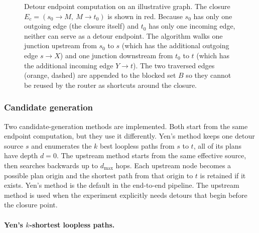 \begin{figure}[H]
\caption{Detour endpoint computation on an illustrative graph. The closure
$E_c = (s_0\!\to\!M,\ M\!\to\!t_0)$ is shown in red. Because $s_0$ has only
one outgoing edge (the closure itself) and $t_0$ has only one incoming edge,
neither can serve as a detour endpoint. The algorithm walks one junction
upstream from $s_0$ to $s$ (which has the additional outgoing edge
$s\!\to\!X$) and one junction downstream from $t_0$ to $t$ (which has the
additional incoming edge $Y\!\to\!t$). The two traversed edges (orange,
dashed) are appended to the blocked set $B$ so they cannot be reused by the
router as shortcuts around the closure.}
\label{fig:detour-endpoints}
\end{figure}

\subsubsection{Candidate generation}
\label{sssec:candidate_generation}

Two candidate-generation methods are implemented. Both start from the same
endpoint computation, but they use it differently. Yen's method keeps one
detour source $s$ and enumerates the $k$ best loopless paths from $s$ to
$t$, all of its plans have depth $d=0$. The upstream method starts
from the same effective source, then searches backwards up to
$d_{\max}$ hops. Each upstream node becomes a possible plan origin and the
shortest path from that origin to $t$ is retained if it exists. Yen's method
is the default in the end-to-end pipeline. The upstream method is used when
the experiment explicitly needs detours that begin before the closure point.

\paragraph{Yen's $k$-shortest loopless paths.}
\label{par:yen_dpm}

